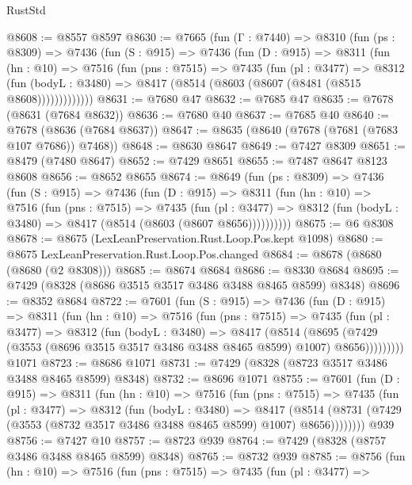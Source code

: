 \begin{lexlean}{RustStd}
\begin{coremodule}
@8608 := @8557 @8597
@8630 := @7665
    (fun (Γ : @7440) =>
    @8310
      (fun (ps : @8309) =>
      @7436
        (fun (S : @915) =>
        @7436
          (fun (D : @915) =>
          @8311
            (fun (hn : @10) =>
            @7516
              (fun (pns : @7515) =>
              @7435
                (fun (pl : @3477) =>
                @8312
                  (fun (bodyL : @3480) =>
                  @8417 (@8514 (@8603 (@8607 (@8481 (@8515 @8608)))))))))))))
@8631 := @7680 @47
@8632 := @7685 @47
@8635 := @7678 (@8631 (@7684 @8632))
@8636 := @7680 @40
@8637 := @7685 @40
@8640 := @7678 (@8636 (@7684 @8637))
@8647 := @8635 (@8640 (@7678 (@7681 (@7683 @107 @7686)) @7468))
@8648 := @8630 @8647
@8649 := @7427 @8309
@8651 := @8479 (@7480 @8647)
@8652 := @7429 @8651
@8655 := @7487 @8647 @8123 @8608
@8656 := @8652 @8655
@8674 := @8649
    (fun (ps : @8309) =>
    @7436
      (fun (S : @915) =>
      @7436
        (fun (D : @915) =>
        @8311
          (fun (hn : @10) =>
          @7516
            (fun (pns : @7515) =>
            @7435
              (fun (pl : @3477) =>
              @8312 (fun (bodyL : @3480) => @8417 (@8514 (@8603 (@8607 @8656))))))))))
@8675 := @6 @8308
@8678 := @8675 (LexLeanPreservation.Rust.Loop.Pos.kept @1098)
@8680 := @8675 LexLeanPreservation.Rust.Loop.Pos.changed
@8684 := @8678 (@8680 (@8680 (@2 @8308)))
@8685 := @8674 @8684
@8686 := @8330 @8684
@8695 := @7429 (@8328 (@8686 @3515 @3517 @3486 @3488 @8465 @8599) @8348)
@8696 := @8352 @8684
@8722 := @7601
    (fun (S : @915) =>
    @7436
      (fun (D : @915) =>
      @8311
        (fun (hn : @10) =>
        @7516
          (fun (pns : @7515) =>
          @7435
            (fun (pl : @3477) =>
            @8312
              (fun (bodyL : @3480) =>
              @8417
                (@8514
                  (@8695
                    (@7429 (@3553 (@8696 @3515 @3517 @3486 @3488 @8465 @8599) @1007) @8656)))))))))
    @1071
@8723 := @8686 @1071
@8731 := @7429 (@8328 (@8723 @3517 @3486 @3488 @8465 @8599) @8348)
@8732 := @8696 @1071
@8755 := @7601
    (fun (D : @915) =>
    @8311
      (fun (hn : @10) =>
      @7516
        (fun (pns : @7515) =>
        @7435
          (fun (pl : @3477) =>
          @8312
            (fun (bodyL : @3480) =>
            @8417
              (@8514 (@8731 (@7429 (@3553 (@8732 @3517 @3486 @3488 @8465 @8599) @1007) @8656))))))))
    @939
@8756 := @7427 @10
@8757 := @8723 @939
@8764 := @7429 (@8328 (@8757 @3486 @3488 @8465 @8599) @8348)
@8765 := @8732 @939
@8785 := @8756
    (fun (hn : @10) =>
    @7516
      (fun (pns : @7515) =>
      @7435
        (fun (pl : @3477) =>

\end{coremodule}
\end{lexlean}
